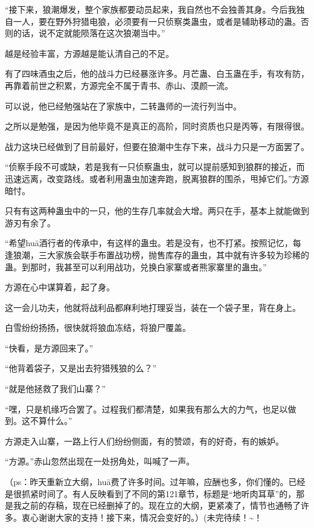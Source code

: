 \begin{this_body}
“接下来，狼潮爆发，整个家族都要动员起来，我自然也不会独善其身。今后我独自一人，要在野外狩猎电狼，必须要有一只侦察类蛊虫，或者是辅助移动的蛊。否则的话，说不定就能陨落在这次狼潮当中。”

越是经验丰富，方源越是能认清自己的不足。

有了四味酒虫之后，他的战斗力已经暴涨许多。月芒蛊、白玉蛊在手，有攻有防，再靠着前世之积累，方源完全不属于青书、赤山、漠颜一流。

可以说，他已经勉强站在了家族中，二转蛊师的一流行列当中。

之所以是勉强，是因为他毕竟不是真正的高阶，同时资质也只是丙等，有限得很。

战力这块已经做到了目前最好，但要在狼潮中生存下来，战斗力只是一方面罢了。

“侦察手段不可或缺，若是我有一只侦察蛊虫，就可以提前感知到狼群的接近，而迅速远离，改变路线。或者利用蛊虫加速奔跑，脱离狼群的围杀，甩掉它们。”方源暗忖。

只有有这两种蛊虫中的一只，他的生存几率就会大增。两只在手，基本上就能做到游刃有余了。

“希望huā酒行者的传承中，有这样的蛊虫。若是没有，也不打紧。按照记忆，每逢狼潮，三大家族会联手布置战功榜，抛售库存的蛊虫，其中就有许多较为珍稀的蛊。到那时，我甚至可以利用战功，兑换白家寨或者熊家寨里的蛊虫。”

方源在心中谋算着，起了身。

这一会儿功夫，他就将战利品都麻利地打理妥当，装在一个袋子里，背在身上。

白雪纷纷扬扬，很快就将狼血冻结，将狼尸覆盖。

“快看，是方源回来了。”

“他背着袋子，又是出去狩猎残狼的么？”

“就是他拯救了我们山寨？”

“嘿，只是机缘巧合罢了。过程我们都清楚，如果我有那么大的力气，也足以做到。这不算什么。”

方源走入山寨，一路上行人们纷纷侧面，有的赞颂，有的好奇，有的嫉妒。

“方源。”赤山忽然出现在一处拐角处，叫喊了一声。

（ps：昨天重新立大纲，huā费了许多时间。过年嘛，应酬也多，你们懂的。已经是很抓紧时间了。有人反映看到了不同的第121章节，标题是“地听肉耳草”的，那是我之前的存稿，现在已经删掉了的。现在立的大纲，更紧凑了，情节也通畅了许多。衷心谢谢大家的支持！接下来，情况会变好的。）(未完待续！\~{}！

\end{this_body}

